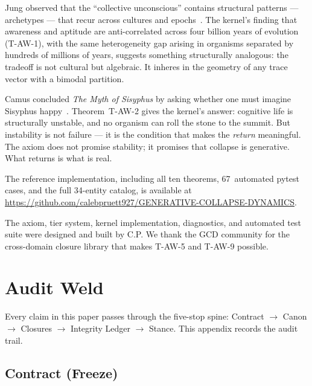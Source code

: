\documentclass[
  aps,
  prd,
  twocolumn,
  superscriptaddress,
  nofootinbib,
  floatfix
]{revtex4-2}
\begin{document}
Jung observed that the ``collective unconscious'' contains
structural patterns --- archetypes --- that recur across
cultures and epochs~\cite{jung1969archetypes}.  The kernel's
finding that awareness and aptitude are anti-correlated
across four billion years of evolution (T-AW-1), with the
same heterogeneity gap arising in organisms separated by
hundreds of millions of years, suggests something
structurally analogous: the tradeoff is not cultural but
algebraic.  It inheres in the geometry of any trace vector
with a bimodal partition.

Camus concluded \emph{The Myth of Sisyphus} by asking
whether one must imagine Sisyphus
happy~\cite{camus1942sisyphus}.  Theorem~T-AW-2 gives the
kernel's answer: cognitive life is structurally unstable, and
no organism can roll the stone to the summit.  But instability
is not failure --- it is the condition that makes the
\emph{return} meaningful.  The axiom does not promise
stability; it promises that collapse is generative.  What
returns is what is real.

The reference implementation, including all ten theorems,
67~automated pytest cases, and the full 34-entity catalog,
is available at
\url{https://github.com/calebpruett927/GENERATIVE-COLLAPSE-DYNAMICS}.

\begin{acknowledgments}
The axiom, tier system, kernel implementation, diagnostics,
and automated test suite were designed and built by C.P.
We thank the GCD community for the cross-domain closure
library that makes T-AW-5 and T-AW-9 possible.
\end{acknowledgments}

\appendix

\section{Audit Weld}\label{app:audit}

Every claim in this paper passes through the
five-stop spine: Contract $\to$ Canon $\to$ Closures $\to$
Integrity Ledger $\to$ Stance.  This appendix records the
audit trail.

\subsection{Contract (Freeze)}
\end{document}
